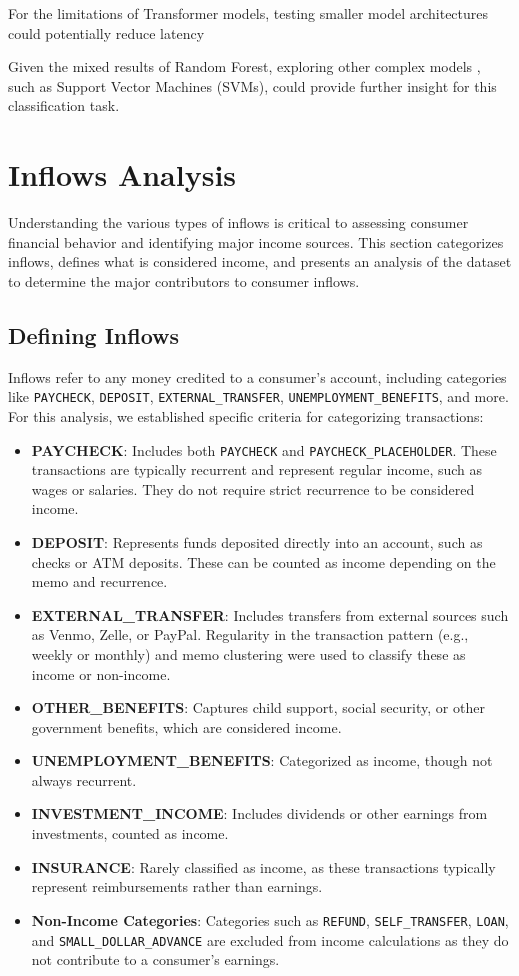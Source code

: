 \documentclass[12pt,letterpaper]{article}
\begin{document}
For the limitations of Transformer models, testing smaller model architectures could potentially reduce latency

Given the mixed results of Random Forest, exploring other complex models , such as Support Vector Machines (SVMs), could provide further insight for this classification task.

\section{Inflows Analysis}
Understanding the various types of inflows is critical to assessing consumer financial behavior and identifying major income sources. This section categorizes inflows, defines what is considered income, and presents an analysis of the dataset to determine the major contributors to consumer inflows.

\subsection{Defining Inflows}
Inflows refer to any money credited to a consumer's account, including categories like \texttt{PAYCHECK}, \texttt{DEPOSIT}, \texttt{EXTERNAL\_TRANSFER}, \texttt{UNEMPLOYMENT\_BENEFITS}, and more. For this analysis, we established specific criteria for categorizing transactions:

\begin{itemize}
    \item \textbf{PAYCHECK}: Includes both \texttt{PAYCHECK} and \texttt{PAYCHECK\_PLACEHOLDER}. These transactions are typically recurrent and represent regular income, such as wages or salaries. They do not require strict recurrence to be considered income.
    \item \textbf{DEPOSIT}: Represents funds deposited directly into an account, such as checks or ATM deposits. These can be counted as income depending on the memo and recurrence.
    \item \textbf{EXTERNAL\_TRANSFER}: Includes transfers from external sources such as Venmo, Zelle, or PayPal. Regularity in the transaction pattern (e.g., weekly or monthly) and memo clustering were used to classify these as income or non-income.
    \item \textbf{OTHER\_BENEFITS}: Captures child support, social security, or other government benefits, which are considered income.
    \item \textbf{UNEMPLOYMENT\_BENEFITS}: Categorized as income, though not always recurrent.
    \item \textbf{INVESTMENT\_INCOME}: Includes dividends or other earnings from investments, counted as income.
    \item \textbf{INSURANCE}: Rarely classified as income, as these transactions typically represent reimbursements rather than earnings.
    \item \textbf{Non-Income Categories}: Categories such as \texttt{REFUND}, \texttt{SELF\_TRANSFER}, \texttt{LOAN}, and \texttt{SMALL\_DOLLAR\_ADVANCE} are excluded from income calculations as they do not contribute to a consumer's earnings.
\end{itemize}
\end{document}
